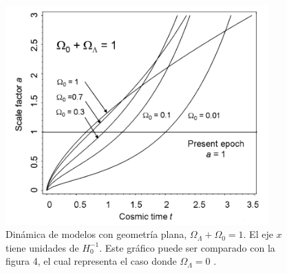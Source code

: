 \documentclass[11pt]{article}
\begin{document}
    
    \begin{figure}[H]         
     \centering
     \includegraphics[width=0.9\textwidth]{flat_models_pp229_Malcolm.png}
        \caption{\footnotesize{Dinámica de modelos con geometría plana, $\Omega_{\Lambda} + \Omega_0 = 1$. El eje $x$ tiene unidades de  $H_0^{-1}$. Este gráfico puede ser comparado con la figura 4, el cual representa el caso donde $\Omega_{\Lambda}=0$ .}}
     \end{figure}
    
    
    
    
    
    
    
    
    
    
    
    
    
    
    
    
    
    
    
    
    
    
    
    
    
    
    
    
    
    
    
    
    
    
\end{document}
